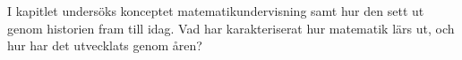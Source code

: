 \textcolor{lila}{I kapitlet undersöks konceptet matematikundervisning samt hur den sett ut genom historien fram till idag. Vad har karakteriserat hur matematik lärs ut, och hur har det utvecklats genom åren?}